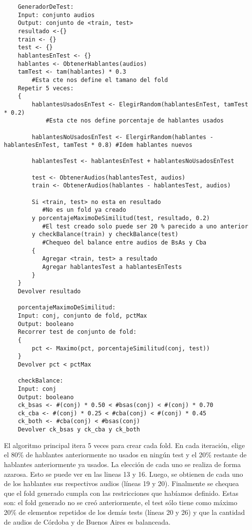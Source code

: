 \begin{lstlisting}
    GeneradorDeTest:
    Input: conjunto audios
    Output: conjunto de <train, test>
    resultado <-{}
    train <- {}
    test <- {}
    hablantesEnTest <- {}
    hablantes <- ObtenerHablantes(audios)
    tamTest <- tam(hablantes) * 0.3 
        #Esta cte nos define el tamano del fold
    Repetir 5 veces:
    {
        hablantesUsadosEnTest <- ElegirRandom(hablantesEnTest, tamTest * 0.2) 
            #Esta cte nos define porcentaje de hablantes usados
    
        hablantesNoUsadosEnTest <- ElergirRandom(hablantes - hablantesEnTest, tamTest * 0.8) #Idem hablantes nuevos
    
        hablantesTest <- hablantesEnTest + hablantesNoUsadosEnTest

        test <- ObtenerAudios(hablantesTest, audios)
        train <- ObtenerAudios(hablantes - hablantesTest, audios)

        Si <train, test> no esta en resultado 
           #No es un fold ya creado
        y porcentajeMaximoDeSimilitud(test, resultado, 0.2) 
           #El test creado solo puede ser 20 % parecido a uno anterior
        y checkBalance(train) y checkBalance(test) 
           #Chequeo del balance entre audios de BsAs y Cba
        {
           Agregar <train, test> a resultado
           Agregar hablantesTest a hablantesEnTests
        }
    }
    Devolver resultado
    
    porcentajeMaximoDeSimilitud:
    Input: conj, conjunto de fold, pctMax
    Output: booleano
    Recorrer test de conjunto de fold:
    {
        pct <- Maximo(pct, porcentajeSimilitud(conj, test))
    }
    Devolver pct < pctMax

    checkBalance:
    Input: conj
    Output: booleano
    ck_bsas <- #(conj) * 0.50 < #bsas(conj) < #(conj) * 0.70
    ck_cba <- #(conj) * 0.25 < #cba(conj) < #(conj) * 0.45
    ck_both <- #cba(conj) < #bsas(conj)
    Devolver ck_bsas y ck_cba y ck_both
\end{lstlisting}

El algoritmo principal itera 5 veces para crear cada fold. En cada iteración, elige el 80\% de hablantes anteriormente no usados en ningún test y el 20\% restante de hablantes anteriormente ya usados. La elección de cada uno se realiza de forma azarosa. Esto se puede ver en las lineas 13 y 16. Luego, se obtienen de cada uno de los hablantes sus respectivos audios (líneas 19 y 20). Finalmente se chequea que el fold generado cumpla con las restricciones que habíamos definido. Estas son: el fold generado no se creó anteriormente, el test sólo tiene como máximo 20\% de elementos repetidos de los demás tests (líneas 20 y 26) y que la cantidad de audios de Córdoba y de Buenos Aires es balanceada.

